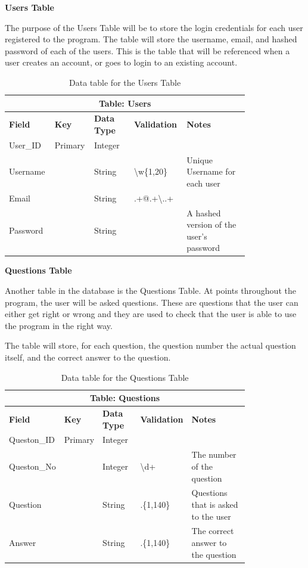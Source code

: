 \documentclass{article}
\begin{document}
\clearpage
\textbf{Users Table}

The purpose of the Users Table will be to store the login credentials for each user registered to the program. The table will store the username, email, and hashed password of each of the users. This is the table that will be referenced when a user creates an account, or goes to login to an existing account.

\begin{table}[ht]
    \centering
    \begin{tabular}{ | p{0.15\linewidth} | p{0.1\linewidth} | p{0.16\linewidth} | p{0.14\linewidth} | p{0.25\linewidth} | }
    \hline
    \multicolumn{5}{|c|}{\textbf{Table: Users}}\\
    \hline
    \hline
    \textbf{Field} & \textbf{Key} & \textbf{Data Type} & \textbf{Validation} & \textbf{Notes} \\
    \hline
    User\_ID & Primary & Integer & & \\
    \hline
    Username & & String & \textbackslash w\{1,20\} & Unique Username for each user\\
    \hline
    Email & & String & .+@.+\textbackslash ..+ & \\
    \hline
    Password & & String & & A hashed version of the user's password\\
    \hline
    \end{tabular}
    \caption{Data table for the Users Table}
\end{table}

\textbf{Questions Table}

Another table in the database is the Questions Table. At points throughout the program, the user will be asked questions. These are questions that the user can either get right or wrong and they are used to check that the user is able to use the program in the right way.

The table will store, for each question, the question number the actual question itself, and the correct answer to the question.

\begin{table}[ht]
    \centering
    \begin{tabular}{ | p{0.15\linewidth} | p{0.1\linewidth} | p{0.16\linewidth} | p{0.14\linewidth} | p{0.25\linewidth} | }
    \hline
    \multicolumn{5}{|c|}{\textbf{Table: Questions}}\\
    \hline
    \hline
    \textbf{Field} & \textbf{Key} & \textbf{Data Type} & \textbf{Validation} & \textbf{Notes} \\
    \hline
    Queston\_ID & Primary & Integer & & \\
    \hline
    Queston\_No & & Integer & \textbackslash d+ & The number of the question\\
    \hline
    Question & & String & .\{1,140\} & Questions that is asked to the user\\
    \hline
    Answer & & String & .\{1,140\} & The correct answer to the question\\
    \hline
    \end{tabular}
    \caption{Data table for the Questions Table}
\end{table}
\end{document}
